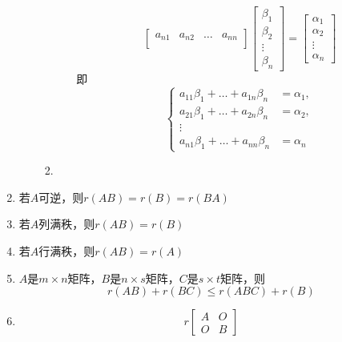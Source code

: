 \documentclass[a4paper,12pt]{article}
\begin{document}
\begin{enumerate}
\begin{enumerate}
\begin{enumerate}
\begin{itemize}
\[\begin{bmatrix}
                            a_{n1} & a_{n2} & \dots & a_{nn} \\
                        \end{bmatrix}
                        \begin{bmatrix}
                            \beta_1 \\ \beta_2 \\ \vdots \\ \beta_n
                        \end{bmatrix}
                        =
                        \begin{bmatrix}
                            \alpha_1 \\ \alpha_2 \\ \vdots \\ \alpha_n
                        \end{bmatrix}
                    \]
                    即
                    \[
                        \begin{cases}
                            a_{11}\beta_1 + \dots + a_{1n}\beta_n &= \alpha_1, \\
                            a_{21}\beta_1 + \dots + a_{2n}\beta_n &= \alpha_2, \\
                            \vdots & \\
                            a_{n1}\beta_1 + \dots + a_{nn}\beta_n &= \alpha_n
                        \end{cases}
                    \]
                \end{itemize}
                \item {\color[rgb]{0.2, 0.6, 0.3}{矩阵$AB$的列向量可由$A$的列向量线性表出}}
            \end{enumerate}
        \end{enumerate}
        \item 若$A$可逆，则$r(AB) = r(B) = r(BA)$
        \item 若$A$列满秩，则$r(AB) = r(B)$
        \item 若$A$行满秩，则$r(AB) = r(A)$
        \item $A$是$m \times n$矩阵，$B$是$n \times s$矩阵，$C$是$s \times t$矩阵，则
        \[
            r(AB) + r(BC) \le r(ABC) + r(B)
        \]
        \item
        \[
            r\!\begin{bmatrix}
                   A & O \\
                   O & B
            \end{bmatrix}
\]
\end{enumerate}
\end{document}
